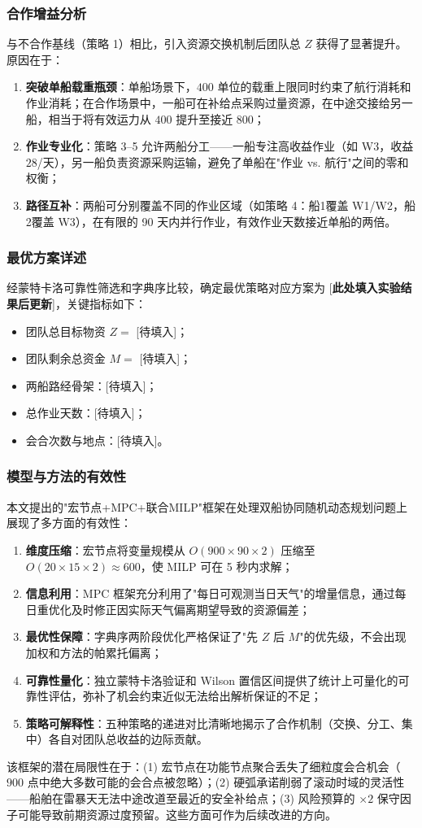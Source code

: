 \subsubsection{合作增益分析}

与不合作基线（策略 1）相比，引入资源交换机制后团队总 $Z$ 获得了显著提升。原因在于：
\begin{enumerate}
    \item \textbf{突破单船载重瓶颈}：单船场景下，$400$ 单位的载重上限同时约束了航行消耗和作业消耗；在合作场景中，一船可在补给点采购过量资源，在中途交接给另一船，相当于将有效运力从 $400$ 提升至接近 $800$；
    \item \textbf{作业专业化}：策略 3--5 允许两船分工——一船专注高收益作业（如 W3，收益 $28$/天），另一船负责资源采购运输，避免了单船在"作业 vs. 航行"之间的零和权衡；
    \item \textbf{路径互补}：两船可分别覆盖不同的作业区域（如策略 4：船1覆盖 W1/W2，船2覆盖 W3），在有限的 90 天内并行作业，有效作业天数接近单船的两倍。
\end{enumerate}

\subsubsection{最优方案详述}

经蒙特卡洛可靠性筛选和字典序比较，确定最优策略对应方案为 [\textbf{此处填入实验结果后更新}]，关键指标如下：

\begin{itemize}
    \item 团队总目标物资 $Z = $ [待填入]；
    \item 团队剩余总资金 $M = $ [待填入]；
    \item 两船路经骨架：[待填入]；
    \item 总作业天数：[待填入]；
    \item 会合次数与地点：[待填入]。
\end{itemize}

\subsubsection{模型与方法的有效性}

本文提出的"宏节点+MPC+联合MILP"框架在处理双船协同随机动态规划问题上展现了多方面的有效性：
\begin{enumerate}
    \item \textbf{维度压缩}：宏节点将变量规模从 $O(900\times90\times2)$ 压缩至 $O(20\times15\times2)\approx600$，使 MILP 可在 5 秒内求解；
    \item \textbf{信息利用}：MPC 框架充分利用了"每日可观测当日天气"的增量信息，通过每日重优化及时修正因实际天气偏离期望导致的资源偏差；
    \item \textbf{最优性保障}：字典序两阶段优化严格保证了"先 $Z$ 后 $M$"的优先级，不会出现加权和方法的帕累托偏离；
    \item \textbf{可靠性量化}：独立蒙特卡洛验证和 Wilson 置信区间提供了统计上可量化的可靠性评估，弥补了机会约束近似无法给出解析保证的不足；
    \item \textbf{策略可解释性}：五种策略的递进对比清晰地揭示了合作机制（交换、分工、集中）各自对团队总收益的边际贡献。
\end{enumerate}

该框架的潜在局限性在于：(1) 宏节点在功能节点聚合丢失了细粒度会合机会（$900$ 点中绝大多数可能的会合点被忽略）；(2) 硬弧承诺削弱了滚动时域的灵活性——船舶在雷暴天无法中途改道至最近的安全补给点；(3) 风险预算的 $\times2$ 保守因子可能导致前期资源过度预留。这些方面可作为后续改进的方向。
